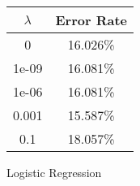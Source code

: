 \begin{center}
\begin{tabular}{|c|c|}
\hline
$\lambda$ & Error Rate \\
\hline
0 & 16.026\% \\
\hline
1e-09 & 16.081\% \\
\hline
1e-06 & 16.081\% \\
\hline
0.001 & 15.587\% \\
\hline
0.1 & 18.057\% \\
\hline
\hline
\end{tabular}
\end{center}
\caption{Logistic Regression}\label{tab:logreg}
